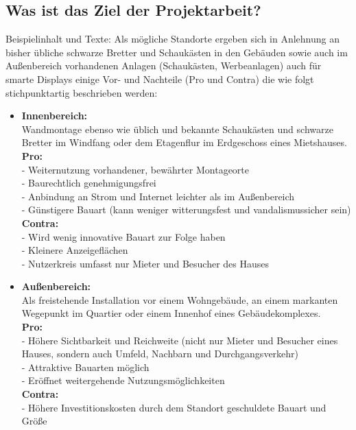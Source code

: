 \subsection{Was ist das Ziel der Projektarbeit?}
Beispielinhalt und Texte:
Als mögliche Standorte ergeben sich in Anlehnung an bisher übliche \glqq{}schwarze Bretter\grqq{} und \glqq{}Schaukästen\grqq{} in den Gebäuden sowie auch im Außenbereich vorhandenen Anlagen (Schaukästen, Werbeanlagen) auch für smarte Displays einige Vor- und Nachteile (Pro und Contra) die wie folgt stichpunktartig beschrieben werden: 

 \begin{itemize}
	 \item \textbf{Innenbereich:} 
	 \\ Wandmontage ebenso wie üblich und bekannte Schaukästen und schwarze Bretter im Windfang oder dem Etagenflur im Erdgeschoss eines Mietshauses.\\
	 \textbf{Pro:}\\
	  - Weiternutzung vorhandener, bewährter Montageorte \\
	  - Baurechtlich genehmigungsfrei \\
	  - Anbindung an Strom und Internet leichter als im Außenbereich \\
	  - Günstigere Bauart (kann weniger witterungsfest und vandalismussicher sein)\\
	 \textbf{Contra:}\\
	  - Wird wenig innovative Bauart zur Folge haben\\
	  - Kleinere Anzeigeflächen \\
	  - Nutzerkreis umfasst nur Mieter und Besucher des Hauses
	 \item \textbf{Außenbereich:} 
	 \\ Als freistehende Installation vor einem Wohngebäude, an einem markanten Wegepunkt im Quartier oder einem Innenhof eines Gebäudekomplexes.\\
	 \textbf{Pro:}\\
	  - Höhere Sichtbarkeit und Reichweite (nicht nur Mieter und Besucher eines Hauses, sondern auch Umfeld, Nachbarn und Durchgangsverkehr)  \\
	  - Attraktive Bauarten möglich \\
	  - Eröffnet weitergehende Nutzungsmöglichkeiten \\
	 \textbf{Contra:}\\
	  - Höhere Investitionskosten durch dem Standort geschuldete Bauart und Größe \\

\end{itemize}
